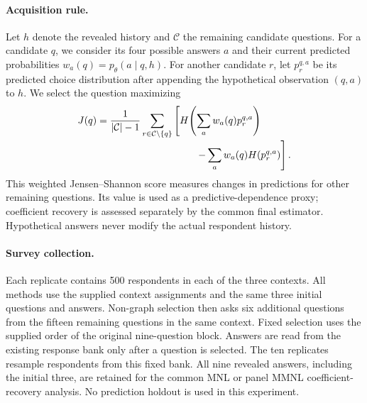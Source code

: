 \paragraph{Acquisition rule.}
Let $h$ denote the revealed history and $\mathcal C$ the remaining candidate
questions. For a candidate $q$, we consider its four possible answers $a$ and
their current predicted probabilities $w_a(q)=p_\theta(a\mid q,h)$.
For another candidate $r$, let $p_r^{q,a}$ be its predicted choice distribution
after appending the hypothetical observation $(q,a)$ to $h$. We select the
question maximizing
\begin{equation}
\begin{aligned}
 J(q) &= \frac{1}{|\mathcal C|-1}
     \sum_{r\in\mathcal C\setminus\{q\}}\left[
       H\!\left(\sum_a w_a(q)p_r^{q,a}\right)\right.\\[-2pt]
 &\hspace{35mm}\left.-\sum_a w_a(q)H(p_r^{q,a})\right].
\end{aligned}
\end{equation}
This weighted Jensen--Shannon score measures changes in predictions for other
remaining questions. Its value is used as a predictive-dependence proxy;
coefficient recovery is assessed separately by the common final estimator.
Hypothetical answers never modify the actual respondent history.

\paragraph{Survey collection.}
Each replicate contains 500 respondents in each of the three contexts. All
methods use the supplied context assignments and the same three initial
questions and answers. Non-graph selection then asks six additional questions
from the fifteen remaining questions in the same context. Fixed selection uses
the supplied order of the original nine-question block. Answers are read from
the existing response bank only after a question is selected. The ten
replicates resample respondents from this fixed bank. All nine revealed answers,
including the initial three, are retained for the common MNL or panel MMNL
coefficient-recovery analysis. No prediction holdout is used in this experiment.
